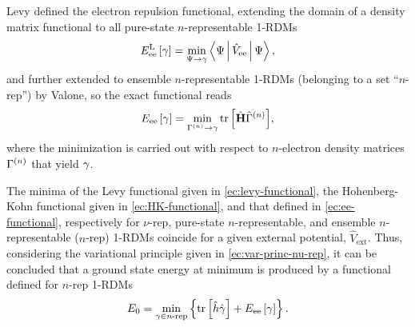 Levy defined the electron repulsion functional, extending the domain of a density matrix 
functional to all pure-state $n$-representable 1-RDMs
\begin{equation} \label{ec:levy-functional}
    \func{E_{\text{ee}}^{\text{L}}}{\fordm} = 
    \min_{\Psi \to \fordm} \Braket{\Psi | \hat{V}_{\text{ee}} | \Psi}
    ,
\end{equation}
and further extended to ensemble $n$-representable 1-RDMs (belonging to a set
``$n$-rep'') by Valone, so the
exact functional reads 
\begin{equation} \label{ec:ee-functional}
    \func{E_{\text{ee}}}{\fordm} =
    \min_{\sordm^{\left( n \right)}\to \fordm} \mytrace{\hat{ \mat{H}} \hat{\sordm}^{\left( n \right)}}
    ,
\end{equation}
where the minimization is carried out with respect to $n$-electron density
matrices $\Gamma^{\left( n \right)}$ that yield $\gamma$.

The minima of the Levy functional given in \cref{ec:levy-functional}, the 
Hohenberg-Kohn functional given in \cref{ec:HK-functional}, and that defined in
\cref{ec:ee-functional}, respectively for $\nu$-rep, pure-state $n$-representable,
and ensemble $n$-representable ($n$-rep) 1-RDMs coincide
for a given external potential, $\hat{V}_{\text{ext}}$.
Thus, considering the variational principle given in \cref{ec:var-princ-nu-rep}, 
it can be concluded that a ground state energy at minimum is produced by a 
functional defined for $n$-rep 1-RDMs
\begin{equation} \label{ec:gs-energy}
    E_0 = \min_{\fordm \in \text{$n$-rep}}
    \left\{ \mytrace{\hat{h} \hat{\fordm}} + \func{E_{\text{ee}}}{\fordm} \right\}
    .
\end{equation}

